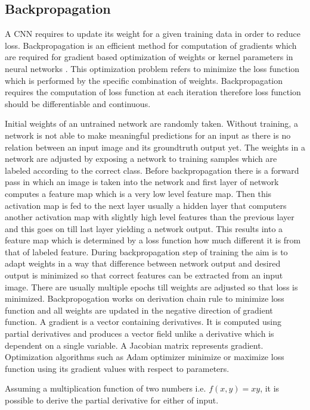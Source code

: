 \documentclass[11pt]{article}
\begin{document}
\subsection{Backpropagation}
A CNN requires to update its weight for a given training data in order to reduce loss. Backpropagation is an efficient method for computation of gradients which are required for gradient based optimization of weights or kernel parameters in neural networks \cite{rumelhart1988learning}. This optimization problem refers to minimize the loss function which is performed by the specific combination of weights. Backpropagation requires the computation of loss function at each iteration therefore loss function should be differentiable and continuous.

Initial weights of an untrained network are randomly taken. Without training, a network is not able to make meaningful predictions for an input as there is no relation between an input image and its groundtruth output yet. The weights in a network are adjusted by exposing a network to training samples which are labeled according to the correct class. Before backpropagation there is a forward pass in which an image is taken into the network and first layer of network computes a feature map which is a very low level feature map. Then this activation map is fed to the next layer usually a hidden layer that computers another activation map with slightly high level features than the previous layer and this goes on till last layer yielding a network output. This results into a feature map which is determined by a loss function how much different it is from that of labeled feature. During backpropagation step of training the aim is to adapt weights in a way that difference between network output and desired output is minimized so that correct features can be extracted from an input image. There are usually multiple epochs till weights are adjusted so that loss is minimized. Backpropogation works on derivation chain rule to minimize loss function and all weights are updated in the negative direction of gradient function. A gradient is a vector containing derivatives. It is computed using partial derivatives and produces a vector field unlike a derivative which is dependent on a single variable. A Jacobian matrix represents gradient. Optimization algorithms such as Adam optimizer minimize or maximize loss function using its gradient values with respect to parameters.

Assuming a multiplication function of two numbers i.e. $f(x, y)=x y$, it is possible to derive the partial derivative for either of input.
\end{document}
